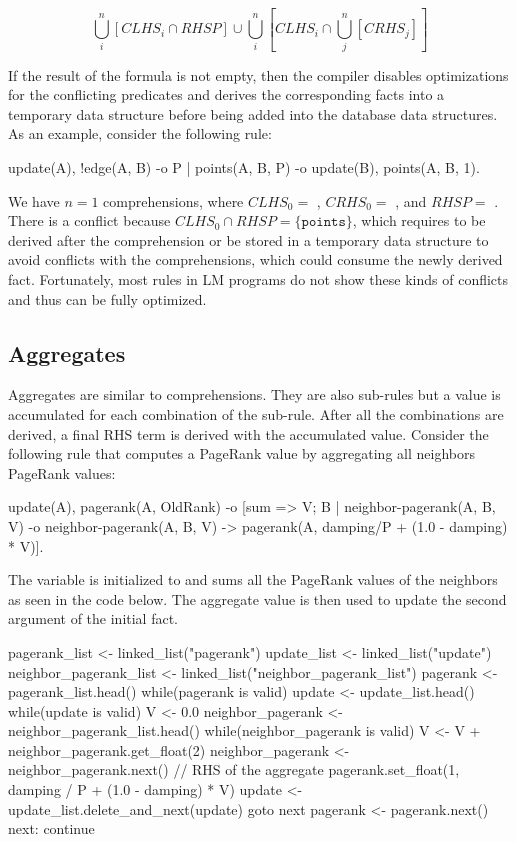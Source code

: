 \[
\bigcup^{n}_i[CLHS_i \cap RHSP] \cup \bigcup^{n}_i [CLHS_i \cap \bigcup^{n}_j[CRHS_j]]
\]

If the result of the formula is not empty, then the compiler disables
optimizations for the conflicting predicates and derives the corresponding facts
into a temporary data structure before being added into the database data
structures. As an example, consider the following rule:

\begin{Code}
update(A),
!edge(A, B)
   -o {P | points(A, B, P) -o update(B)},
      points(A, B, 1).
\end{Code}

We have $n = 1$ comprehensions, where $CLHS_0 = $ ,
$CRHS_0 =$ , and $RHSP = $ . There is a
conflict because $CLHS_0 \cap RHSP = \{\mathtt{points}\}$, which requires
 to be derived after the comprehension or be stored in a
temporary data structure to avoid conflicts with the comprehensions, which could
consume the newly derived fact. Fortunately, most rules in LM programs do not
show these kinds of conflicts and thus can be fully optimized.

\subsection{Aggregates}

Aggregates are similar to comprehensions. They are also sub-rules but a value is
accumulated for each combination of the sub-rule. After all the combinations are
derived, a final RHS term is derived with the accumulated value. Consider the
following rule that computes a PageRank value by aggregating all neighbors
PageRank values:

\begin{Code}
update(A),
pagerank(A, OldRank)
      -o [sum => V; B | neighbor-pagerank(A, B, V) -o neighbor-pagerank(A, B, V)
            -> pagerank(A, damping/P + (1.0 - damping) * V)].
\end{Code}

The variable  is initialized to  and sums all the PageRank
values of the neighbors as seen in the code below. The aggregate value is then
used to update the second argument of the initial  fact.

\begin{LineCode}
pagerank_list <- linked_list("pagerank")
update_list <- linked_list("update")
neighbor_pagerank_list <- linked_list("neighbor_pagerank_list")
pagerank <- pagerank_list.head()
while(pagerank is valid)
{
   update <- update_list.head()
   while(update is valid)
   {
      V <- 0.0
      neighbor_pagerank <- neighbor_pagerank_list.head()
      while(neighbor_pagerank is valid)
      {
         V <- V + neighbor_pagerank.get_float(2)
         neighbor_pagerank <- neighbor_pagerank.next()
      }
      // RHS of the aggregate
      pagerank.set_float(1, damping / P + (1.0 - damping) * V)
      update <- update_list.delete_and_next(update)
      goto next
   }
   pagerank <- pagerank.next()
next:
   continue
}
\end{LineCode}

